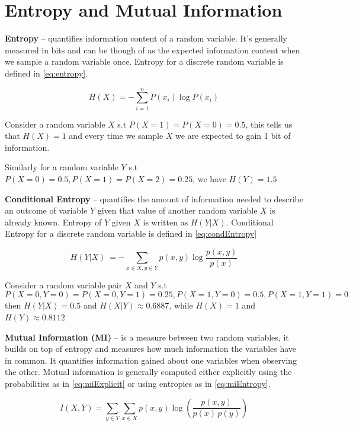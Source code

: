 \section{Entropy and Mutual Information}

\textbf{Entropy} -- quantifies information content of a random variable. It's
generally measured in bits and can be though of as the expected information
content when we sample a random variable once. Entropy for a discrete random
variable is defined in \autoref{eq:entropy}.

\begin{equation}
  H(X)=-\sum _{i=1}^{n}{P (x_{i})\log P(x_{i})}
\label{eq:entropy}
\end{equation}

Consider a random variable $X$ s.t $P(X=1) = P(X=0) = 0.5$, this tells
us that $H(X) = 1$ and every time we sample $X$ we are expected to gain 1 bit of
information.

Similarly for a random variable $Y$ s.t $P(X=0) = 0.5, P(X=1) = P(X=2) = 0.25$,
we have $H(Y) = 1.5$

\textbf{Conditional Entropy} -- quantifies the amount of information needed to
describe an outcome of variable $Y$ given that value of another random variable
$X$ is already known. Entropy of $Y$ given $X$ is written as $H(Y|X)$.
Conditional Entropy for a discrete random variable is defined in
\autoref{eq:condEntropy}

\begin{equation}
H(Y|X)\ =-\sum _{x\in {X},y\in {Y}}p(x,y)\log {\frac {p(x,y)}{p(x)}}
\label{eq:condEntropy}
\end{equation}

Consider a random variable pair $X$ and $Y$ s.t 
$$P(X=0,Y=0) = P(X=0,Y=1) = 0.25, P(X=1,Y=0) = 0.5, P(X=1,Y=1) = 0$$
then $H(Y|X) = 0.5$ and $H(X|Y) \approx 0.6887$, while $H(X) = 1$ and $H(Y)
\approx 0.8112$

\textbf{Mutual Information (MI)} -- is a measure between two random variables,
it builds on top of entropy and measures how much information the variables have
in common. It quantifies information gained about one variables when observing
the other. Mutual information is generally computed either explicitly using the
probabilities as in \autoref{eq:miExplicit} or using entropies as in
\autoref{eq:miEntropy}.

\begin{equation}
      I(X,Y)=\sum _{y\in Y}\sum _{x\in X}{p(x,y)\log {\left({\frac
      {p(x,y)}{p(x)\,p(y)}}\right)}} 
\label{eq:miExplicit}
\end{equation}

